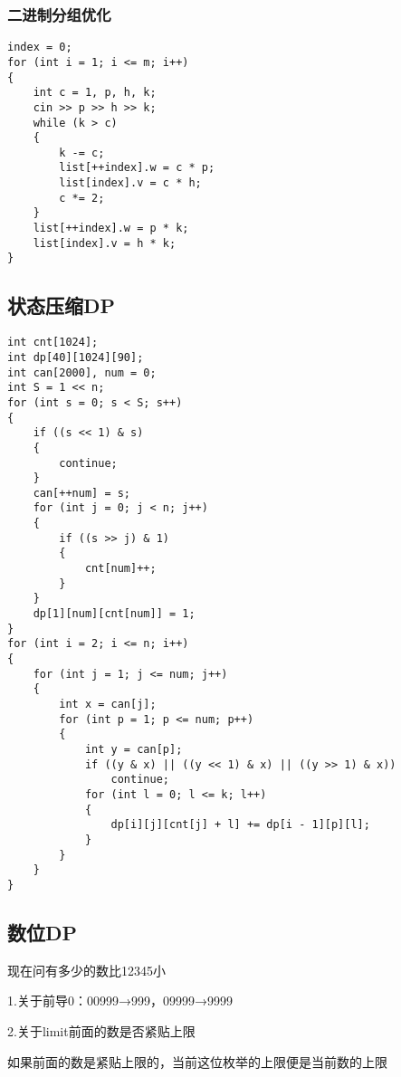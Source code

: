 \documentclass[]{article}
\begin{document}
\hypertarget{ux4e8cux8fdbux5236ux5206ux7ec4ux4f18ux5316}{%
\subsubsection{二进制分组优化}\label{ux4e8cux8fdbux5236ux5206ux7ec4ux4f18ux5316}}

\begin{verbatim}
index = 0;
for (int i = 1; i <= m; i++)
{
    int c = 1, p, h, k;
    cin >> p >> h >> k;
    while (k > c)
    {
        k -= c;
        list[++index].w = c * p;
        list[index].v = c * h;
        c *= 2;
    }
    list[++index].w = p * k;
    list[index].v = h * k;
}
\end{verbatim}

\hypertarget{ux72b6ux6001ux538bux7f29dp}{%
\subsection{状态压缩DP}\label{ux72b6ux6001ux538bux7f29dp}}

\begin{verbatim}
int cnt[1024];
int dp[40][1024][90];
int can[2000], num = 0;
int S = 1 << n;
for (int s = 0; s < S; s++)
{
    if ((s << 1) & s)
    {
        continue;
    }
    can[++num] = s;
    for (int j = 0; j < n; j++)
    {
        if ((s >> j) & 1)
        {
            cnt[num]++;
        }
    }
    dp[1][num][cnt[num]] = 1;
}
for (int i = 2; i <= n; i++)
{
    for (int j = 1; j <= num; j++)
    {
        int x = can[j];
        for (int p = 1; p <= num; p++)
        {
            int y = can[p];
            if ((y & x) || ((y << 1) & x) || ((y >> 1) & x))
                continue;
            for (int l = 0; l <= k; l++)
            {
                dp[i][j][cnt[j] + l] += dp[i - 1][p][l];
            }
        }
    }
}
\end{verbatim}

\hypertarget{ux6570ux4f4ddp}{%
\subsection{数位DP}\label{ux6570ux4f4ddp}}

现在问有多少的数比12345小

1.关于前导0：00999→999，09999→9999

2.关于limit前面的数是否紧贴上限

如果前面的数是紧贴上限的，当前这位枚举的上限便是当前数的上限
\end{document}
